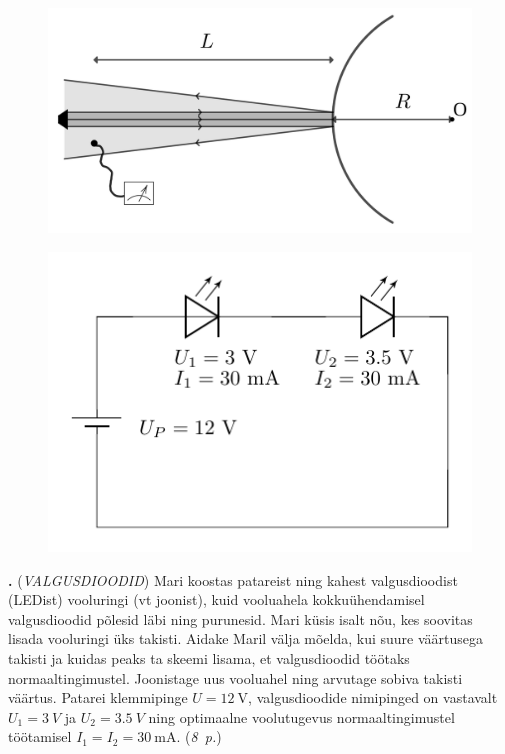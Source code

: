 \documentclass[11pt,a5paper]{article}
\newcommand{\numb}[1]{\vspace{5pt}\textbf{\large #1}}
\newcommand{\nimi}[1]{(\textsl{\small #1})}
\newcommand{\punktid}[1]{(\emph{#1~p.})}
\newcounter{ylesanne}
\newcommand{\yl}[1]{\addtocounter{ylesanne}{1}\numb{\theylesanne.} \nimi{#1} \newblock{}}
\newcommand{\autor}[1]{}%
\begin{document}
\begin{figure}[h]
    \centering
    \includegraphics[width=0.6\linewidth]{hajumine-joonis-v3.png}
\end{figure}

\newpage

\begin{figure}
  \vspace{-30pt}
  \begin{center}
  \includegraphics[scale=0.8]{Joonis_LEDid_yl.pdf}
  \vspace{-20pt}
  \end{center}
\end{figure}

\yl{VALGUSDIOODID} Mari koostas patareist ning kahest valgusdioodist (LEDist) vooluringi (vt joonist), kuid vooluahela kokkuühendamisel valgusdioodid põlesid läbi ning purunesid. Mari küsis isalt nõu, kes soovitas lisada vooluringi üks takisti. Aidake Maril välja mõelda, kui suure väärtusega takisti ja kuidas peaks ta skeemi lisama, et valgusdioodid töötaks normaaltingimustel. Joonistage uus vooluahel ning arvutage sobiva takisti väärtus. Patarei klemmipinge $U=\SI{12}{\V}$, valgusdioodide nimipinged on vastavalt $U_1=\SI{3}{V}$ ja $U_2=\SI{3.5}{V}$ ning optimaalne voolutugevus normaaltingimustel töötamisel $I_1=I_2=\SI{30}{\milli\A}$.
\punktid{8} \autor{Hans Daniel Kaimre}
\end{document}
